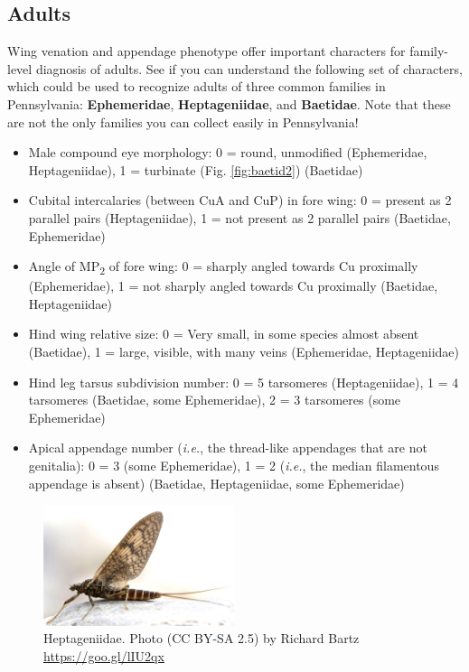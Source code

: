 \documentclass[letterpaper, 11pt]{article}
\begin{document}
\subsection{Adults}
\noindent{}Wing venation and appendage phenotype offer important characters for family-level diagnosis of adults. See if you can understand the following set of characters, which could be used to recognize adults of three common families in Pennsylvania: \textbf{Ephemeridae}, \textbf{Heptageniidae}, and \textbf{Baetidae}. Note that these are not the only families you can collect easily in Pennsylvania!

\begin{itemize}
\item Male compound eye morphology: 0 = round, unmodified (Ephemeridae, Heptageniidae), 1 = turbinate (Fig. \ref{fig:baetid2}) (Baetidae)
\item Cubital intercalaries (between CuA and CuP) in fore wing: 0 = present as 2 parallel pairs (Heptageniidae), 1 = not present as 2 parallel pairs (Baetidae, Ephemeridae)
\item Angle of \texorpdfstring{MP\textsubscript{2}}{ }{ }of fore wing: 0 = sharply angled towards Cu proximally (Ephemeridae), 1 = not sharply angled towards Cu proximally (Baetidae, Heptageniidae)
\item Hind wing relative size: 0 = Very small, in some species almost absent (Baetidae), 1 = large, visible, with many veins (Ephemeridae, Heptageniidae)
\item Hind leg tarsus subdivision number: 0 = 5 tarsomeres (Heptageniidae), 1 = 4 tarsomeres (Baetidae, some Ephemeridae), 2 = 3 tarsomeres (some Ephemeridae)
\item Apical appendage number (\textit{i.e.}, the thread-like appendages that are not genitalia): 0 = 3 (some Ephemeridae), 1 = 2 (\textit{i.e.}, the median filamentous appendage is absent) (Baetidae, Heptageniidae, some Ephemeridae)
\end{itemize}

\begin{figure}[ht!]
  \centering
    \includegraphics[width=0.5\textwidth]{HeptageniidHabitus}
  \caption{Heptageniidae. Photo (CC BY-SA 2.5) by Richard Bartz \url{https://goo.gl/lIU2qx}}
  \label{fig:heptageniid}
\end{figure}
\end{document}
